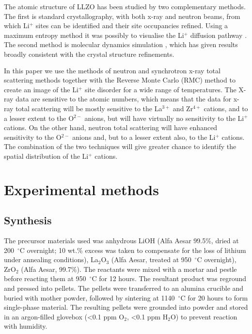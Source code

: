 \documentclass[twoside,twocolumn,9pt]{article}
\begin{document}
The atomic structure of LLZO has been studied by two complementary methods. The first is standard crystallography, with both x-ray \cite{Awaka:2009jv,Buschmann:2011jo,Geiger:2011cg, Awaka:2011il, DanielRettenwander:2016ei,Wagner:2016bh,Kataoka:2019go} and neutron \cite{Awaka:2009jv,Buschmann:2011jo,Xie:2011gv,Han:2012is,Li:2012fz,DanielRettenwander:2016ei,Wang:2014ic} beams, from which Li$^+$ sites can be identified and their site occupancies refined. Using a maximum entropy method it was possibly to visualise the Li$^+$ diffusion pathway \cite{Han:2012is}.
The second method is molecular dynamics simulation \cite{Wang:2014ic,Klenk:2015ey}, which has given results broadly consistent with the crystal structure refinements.

In this paper we use the methods of neutron and synchrotron x-ray total scattering methods together with the Reverse Monte Carlo (RMC) method to create an image of the Li$^+$ site disorder for a wide range of temperatures. The X-ray data are sensitive to the atomic numbers, which means that the data for  x-ray total scattering will be mostly sensitive to the La$^{3+}$ and Zr$^{4+}$ cations, and to a lesser extent to the O$^{2-}$ anions, but will have virtually no sensitivity to the Li$^+$ cations. On the other hand, neutron total scattering will have enhanced sensitivity to the O$^{2-}$ anions and, but to a lesser extent also, to the Li$^+$ cations. The combination of the two techniques will give greater chance to identify the spatial distribution of the  Li$^+$ cations.


\section{Experimental methods}

\subsection{Synthesis}
The precursor materials used was anhydrous LiOH (Alfa Aesar 99.5\%, dried at 200~$^{\circ}$C overnight; 10 wt.\% excess was taken to compensate for the loss of lithium under annealing conditions), La$_2$O$_3$ (Alfa Aesar, treated at 950~$^{\circ}$C overnight), ZrO$_2$ (Alfa Aesar, 99.7\%). The reactants were mixed with a mortar and pestle before reacting them at 950~$^{\circ}$C for 12 hours. The resultant product was reground and pressed into pellets. The pellets were transferred to an alumina crucible and buried with mother powder, followed by sintering at 1140~$^{\circ}$C for 20 hours to form single-phase material. The resulting pellets were grounded into powder and stored in an argon-filled glovebox (<0.1 ppm O$_2$, <0.1 ppm H$_2$O) to prevent reaction with humidity.
\end{document}
